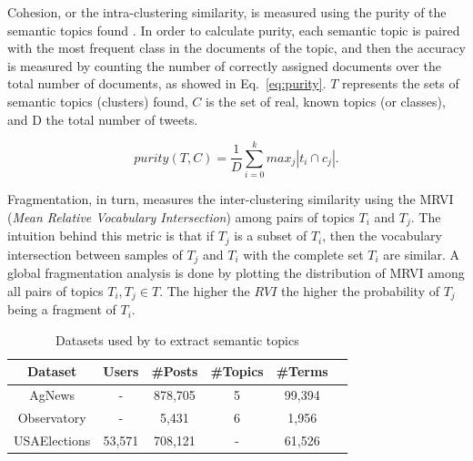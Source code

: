 Cohesion, or the intra-clustering similarity, is measured using the purity of the semantic topics found \cite{witten:2005}. In order to calculate purity, each semantic topic is paired with the most frequent class in the documents of the topic, and then the accuracy is measured by counting the number of correctly assigned documents over the total number of documents, as showed in Eq.~\ref{eq:purity}. 
$T$ represents the sets of semantic topics (clusters) found, $C$ is the set of real, known topics (or classes), and D the total number of tweets. 

\vspace{-0.3cm}
\begin{equation}
\label{eq:purity}
purity(T,C) = \frac{1}{D}\sum_{i=0}^k{max_j|t_i \cap c_j|}.
\end{equation}
\vspace{-0.3cm}

Fragmentation, in turn, measures the inter-clustering 
similarity using the {\sc MRVI} (\textit{Mean Relative Vocabulary Intersection}) \cite{kao2004mining}
among pairs of topics $T_i$ and $T_j$. The intuition behind this metric is that if $T_j$ is a subset of 
$T_i$, then the vocabulary intersection between samples of $T_j$ and $T_i$ with the complete set $T_i$ are similar. A global fragmentation analysis is done by plotting the distribution of MRVI among all pairs of topics $T_i, T_j \in T$. The higher the $RVI$ the higher the probability 
of $T_j$ being a fragment of $T_i$.

\begin{table}[t]
\begin{scriptsize}
\caption{Datasets used by \method to extract semantic topics} \label{tbl:datasets}
    \begin{center}
	\begin{tabular}{|c|c|c|c|c|c|}
	    \hline 
	    Dataset        & Users &\#Posts & \#Topics & \#Terms \\ \hline
	    \hline
	    AgNews         &  -&878,705 & 5       & 99,394 \\ \hline
	    Observatory &  -&5,431  & 6       &1,956 \\ \hline
	    USAElections   &  53,571&708,121& - &  61,526 \\ \hline
	\end{tabular}
    \end{center}
\end{scriptsize}
\end{table}

